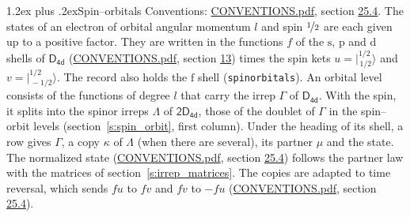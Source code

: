 \documentclass[10pt,a4paper]{article}
\makeatletter
\renewcommand\section{\@startsection{section}{1}{\z@}{-3ex plus -1ex minus -.2ex}%
  {1.2ex plus .2ex}{\normalfont\large\sffamily\bfseries\color{parttitle}}}
\numberwithin{equation}{section}
\newcommand{\grp}[1]{\mathsf{#1}}
\newcommand{\orbital}[1]{\mathrm{#1}}
\newcommand{\mult}{\kappa}
\newcommand{\intx}{\mu}
\newcommand{\jm}[2]{\bigl\lvert{}^{#1}_{\,#2}\bigr\rangle}
\makeatother
\begin{document}
\section{Spin--orbitals}\label{s:spin_orbitals}
Conventions: \href{../../CONVENTIONS.pdf}{CONVENTIONS.pdf}, section \href{../../CONVENTIONS.pdf\#conv.25.4}{25.4}.
\leavevmode\label{n:index.orbital.l}The states of an electron of orbital angular momentum $l$ and spin $\nicefrac{1}{2}$ are each given up to a positive factor. \label{n:local.spinor.uv}\label{n:local.function.f}They are written in the functions $f$ of the $\orbital{s}$, $\orbital{p}$ and $\orbital{d}$ shells of \href{../../../rotation/data/pdf/D4d.pdf}{$\grp{D_{4d}}$} (\href{../../CONVENTIONS.pdf}{CONVENTIONS.pdf}, section \href{../../../rotation/CONVENTIONS.pdf\#conv.13}{13}) times the spin kets $u = \jm{1/2}{1/2}$ and $v = \jm{1/2}{-1/2}$. The record also holds the $\orbital{f}$ shell (\texttt{spinorbitals}). An orbital level consists of the functions of degree $l$ that carry the irrep $\Gamma$ of \href{../../../rotation/data/pdf/D4d.pdf}{$\grp{D_{4d}}$}. With the spin, it splits into the spinor irreps $\Lambda$ of $\grp{2D_{4d}}$, those of the doublet of $\Gamma$ in the spin--orbit levels (section~\ref{s:spin_orbit}, first column). \label{n:head.state}Under the heading of its shell, a row gives $\Gamma$, a copy $\mult$ of $\Lambda$ (when there are several), its partner $\intx$ and the state. The normalized state (\href{../../CONVENTIONS.pdf}{CONVENTIONS.pdf}, section \href{../../CONVENTIONS.pdf\#conv.25.4}{25.4}) follows the partner law with the matrices of section~\ref{s:irrep_matrices}. The copies are adapted to time reversal, which sends $f u$ to $f v$ and $f v$ to $-f u$ (\href{../../CONVENTIONS.pdf}{CONVENTIONS.pdf}, section \href{../../CONVENTIONS.pdf\#conv.25.4}{25.4}).
\end{document}
